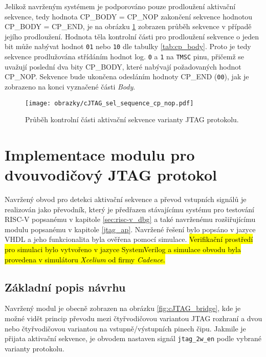 Jelikož navrženým systémem je podporováno pouze prodloužení aktivační sekvence, tedy hodnota CP\_BODY = CP\_NOP zakončení sekvence hodnotou \\CP\_BODY = CP\_END, je na obrázku \ref{fig:cJTAG_sel_cp_nop} zobrazen průběh sekvence v případě jejího prodloužení. Hodnota těla kontrolní části pro prodloužení sekvence o jeden bit může nabývat hodnot \texttt{01} nebo \texttt{10} dle tabulky \ref{tab:cp_body}. Proto je tedy sekvence prodlužována střídáním hodnot log. \texttt{0} a \texttt{1} na \texttt{\acs{TMSC}} pinu, přičemž se uvažují poslední dva bity CP\_BODY, které nabývají požadovaných hodnot CP\_NOP. Sekvence bude ukončena odesláním hodnoty CP\_END (\texttt{00}), jak je zobrazeno na konci vyznačené části \textit{Body}.

\begin{figure}[!h]
  \begin{center}
    \texttt{[image: obrazky/cJTAG\_sel\_sequence\_cp\_nop.pdf]}
  \end{center}
  \caption{Průběh kontrolní části aktivační sekvence varianty \acs{JTAG} protokolu.}
	\label{fig:cJTAG_sel_cp_nop}
\end{figure}

\section{Implementace modulu pro dvouvodičový \acs{JTAG} protokol}
Navržený obvod pro detekci aktivační sekvence a převod vstupních signálů je realizován jako převodník, který je předřazen stávajícímu systému pro testování \acs{RISC-V} popsanému v kapitole \ref{sec:risc-v_dbg} a také navrženému rozšiřujícímu modulu popsanému v kapitole \ref{jtag_ap}. Navržené řešení bylo popsáno v jazyce \acs{VHDL} a jeho funkcionalita byla ověřena pomocí simulace. \hl{Verifikační prostředí pro simulaci bylo vytvořeno v jazyce SystemVerilog a simulace obvodu byla provedena v simulátoru \textit{Xcelium} od firmy \textit{Cadence}.}

\subsection{Základní popis návrhu}	\label{subsec:cJTAG_adapter}
Navržený modul je obecně zobrazen na obrázku \ref{fig:cJTAG_bridge}, kde je možné vidět princip převodu mezi čtyřvodičovou variantou \acs{JTAG} rozhraní a dvou nebo čtyřvodičovou variantou na vstupně/výstupních pinech čipu. Jakmile je přijata aktivační sekvence, je obvodem nastaven signál \texttt{jtag\_2w\_en} podle vybrané varianty protokolu.

